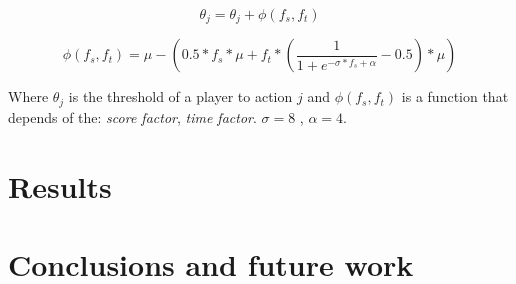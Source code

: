 \documentclass[
10pt, %
a4paper, %
oneside, %
headinclude,footinclude, %
BCOR5mm, %
]{scrartcl}
\begin{document}
\begin{equation}
	\theta_j = \theta_j + \phi(f_s,f_t)
\end{equation}

\begin{equation}
	\phi(f_s, f_t) = \mu - (0.5 * f_s * \mu + f_t *(\frac{1}{1 + e^{-\sigma * f_s + \alpha}} - 0.5)*\mu)
\end{equation}

Where $\theta_j$ is the threshold of a player to action $j$ and $\phi(f_s,f_t)$ is a function that depends of the: \textit{score factor}, \textit{time factor}. $\sigma = 8$ , $\alpha = 4$. 


\section{Results}


\section{Conclusions and future work}


\renewcommand{\refname}{\spacedlowsmallcaps{References}} %




\end{document}
